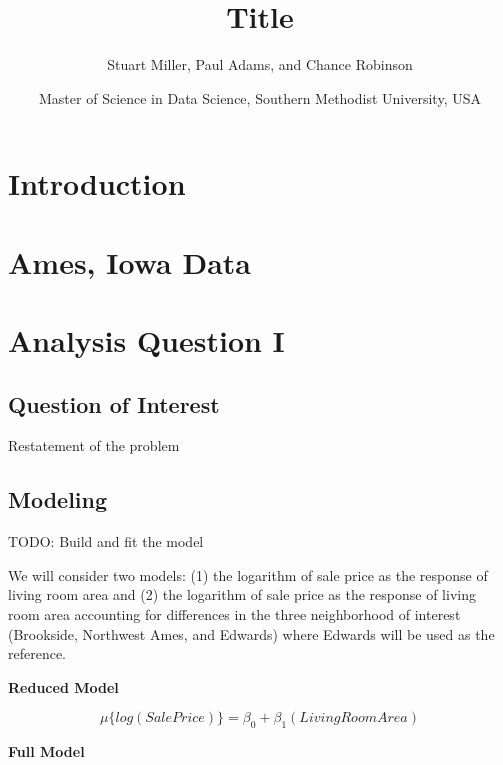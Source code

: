 \documentclass[american,]{article}
\title{Title}
\author{Stuart Miller, Paul Adams, and Chance Robinson}
\date{Master of Science in Data Science, Southern Methodist University, USA}
\begin{document}
\maketitle

\hypertarget{introduction}{%
\section{Introduction}\label{introduction}}

\citet{Sleuth}

\hypertarget{ames-iowa-data}{%
\section{Ames, Iowa Data}\label{ames-iowa-data}}

\citet{Kaggle2016}

\hypertarget{analysis-question-i}{%
\section{Analysis Question I}\label{analysis-question-i}}

\hypertarget{question-of-interest}{%
\subsection{Question of Interest}\label{question-of-interest}}

Restatement of the problem

\hypertarget{modeling}{%
\subsection{Modeling}\label{modeling}}

TODO: Build and fit the model

We will consider two models: (1) the logarithm of sale price as the
response of living room area and (2) the logarithm of sale price as the
response of living room area accounting for differences in the three
neighborhood of interest (Brookside, Northwest Ames, and Edwards) where
Edwards will be used as the reference.

\textbf{Reduced Model}

\begin{equation}
\mu \lbrace log(SalePrice) \rbrace = \beta_0 + \beta_1(LivingRoomArea) \label{eq:reduced}
\end{equation}

\textbf{Full Model}
\end{document}
